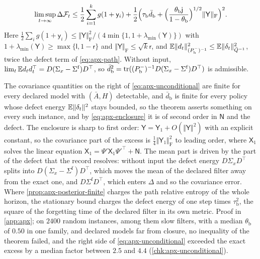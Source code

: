 \begin{theorem}
\begin{enumerate}
\begin{equation}\label{eq:apx-unconditional}
\limsup_{t\to\infty}\Delta\mathcal F_t\le\frac12\sum_{i=1}^kg(1+\mathsf y_i)+\frac12\Bigl(\tau_{\mathrm b}\bar d_{\mathrm b}+\Bigl(\frac{\theta_{\mathrm b}\mathsf j}{1-\theta_{\mathrm b}}\Bigr)^{1/2}\Vert\mathsf Y\Vert_{\mathrm F}\Bigr)^2 .
\end{equation}
Here $\frac12\sum_ig(1+\mathsf y_i)\le\Vert\mathsf Y\Vert_{\mathrm F}^2/(4\min\{1,1+\lambda_{\min}(\mathsf Y)\})$ with $1+\lambda_{\min}(\mathsf Y)\ge\max\{\mathsf l,1-\mathsf r\}$ and $\Vert\mathsf Y\Vert_{\mathrm F}\le\sqrt k\mathsf r$, and $\mathbb{E}\Vert d_t\Vert^2_{(P^-_{\mathrm b})^{-1}}\le\mathbb{E}\Vert\delta_t\Vert^2_{\bar Q^{-1}}$, twice the defect term of \cref{eq:apx-path}. Without input, $\lim_t\mathbb{E} d_td_t^\top=D(\Sigma_x-\Sigma^{\mathrm f})D^\top$, so $\bar d_{\mathrm b}^2=\operatorname{tr}((P^-_{\mathrm b})^{-1}D(\Sigma_x-\Sigma^{\mathrm f})D^\top)$ is admissible.
\end{enumerate}
\end{theorem}

The covariance quantities on the right of \cref{eq:apx-unconditional} are finite for every declared model with $(\bar A,H)$ detectable, and $\bar d_{\mathrm b}$ is finite for every policy whose defect energy $\mathbb{E}\Vert\delta_t\Vert^2$ stays bounded, so the theorem asserts something on every such instance, and by \cref{eq:apx-enclosure} it is of second order in $\mathsf N$ and the defect. The enclosure is sharp to first order: $\mathsf Y=\mathsf Y_1+O(\Vert\mathsf Y\Vert^2)$ with an explicit constant, so the covariance part of the excess is $\frac14\Vert\mathsf Y_1\Vert^2_{\mathrm F}$ to leading order, where $\mathsf X_1$ solves the linear equation $\mathsf X_1=\Psi'\mathsf X_1\Psi'^\top+\mathsf N$. The mean part is driven by the part of the defect that the record resolves: without input the defect energy $D\Sigma_xD^\top$ splits into $D(\Sigma_x-\Sigma^{\mathrm f})D^\top$, which moves the mean of the declared filter away from the exact one, and $D\Sigma^{\mathrm f}D^\top$, which enters $\Delta$ and so the covariance error. Where \cref{prop:apx-posterior-finite} charges the path relative entropy of the whole horizon, the stationary bound charges the defect energy of one step times $\tau_{\mathrm b}^2$, the square of the forgetting time of the declared filter in its own metric. Proof in \cref{app:apx}; on $2400$ random instances, among them slow filters, with a median $\theta_{\mathrm b}$ of $0.50$ in one family, and declared models far from closure, no inequality of the theorem failed, and the right side of \cref{eq:apx-unconditional} exceeded the exact excess by a median factor between $2.5$ and $4.4$ (\cref{chk:apx-unconditional}).

